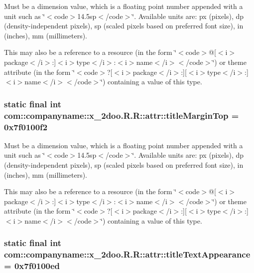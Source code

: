 Must be a dimension value, which is a floating point number appended with a unit such as \char`\"{}$<$code$>$14.5sp$<$/code$>$\char`\"{}. Available units are: px (pixels), dp (density-independent pixels), sp (scaled pixels based on preferred font size), in (inches), mm (millimeters). 

This may also be a reference to a resource (in the form \char`\"{}$<$code$>$@\mbox{[}$<$i$>$package$<$/i$>$:\mbox{]}$<$i$>$type$<$/i$>$:$<$i$>$name$<$/i$>$$<$/code$>$\char`\"{}) or theme attribute (in the form \char`\"{}$<$code$>$?\mbox{[}$<$i$>$package$<$/i$>$:\mbox{]}\mbox{[}$<$i$>$type$<$/i$>$:\mbox{]}$<$i$>$name$<$/i$>$$<$/code$>$\char`\"{}) containing a value of this type. \hypertarget{classcom_1_1companyname_1_1x__2doo_1_1_r_1_1attr_e2fcf93b6f5f16306b3eb381362f7837}{
\subsubsection[{titleMarginTop}]{\setlength{\rightskip}{0pt plus 5cm}static final int com::companyname::x\_\-2doo.R.R::attr::titleMarginTop = 0x7f0100f2}}
\label{classcom_1_1companyname_1_1x__2doo_1_1_r_1_1attr_e2fcf93b6f5f16306b3eb381362f7837}


Must be a dimension value, which is a floating point number appended with a unit such as \char`\"{}$<$code$>$14.5sp$<$/code$>$\char`\"{}. Available units are: px (pixels), dp (density-independent pixels), sp (scaled pixels based on preferred font size), in (inches), mm (millimeters). 

This may also be a reference to a resource (in the form \char`\"{}$<$code$>$@\mbox{[}$<$i$>$package$<$/i$>$:\mbox{]}$<$i$>$type$<$/i$>$:$<$i$>$name$<$/i$>$$<$/code$>$\char`\"{}) or theme attribute (in the form \char`\"{}$<$code$>$?\mbox{[}$<$i$>$package$<$/i$>$:\mbox{]}\mbox{[}$<$i$>$type$<$/i$>$:\mbox{]}$<$i$>$name$<$/i$>$$<$/code$>$\char`\"{}) containing a value of this type. \hypertarget{classcom_1_1companyname_1_1x__2doo_1_1_r_1_1attr_1dfbda9d281812236b99a626c5cad5f2}{
\subsubsection[{titleTextAppearance}]{\setlength{\rightskip}{0pt plus 5cm}static final int com::companyname::x\_\-2doo.R.R::attr::titleTextAppearance = 0x7f0100ed}}
\label{classcom_1_1companyname_1_1x__2doo_1_1_r_1_1attr_1dfbda9d281812236b99a626c5cad5f2}


